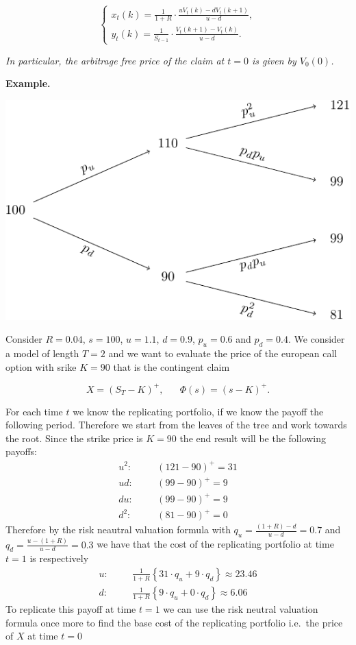 \documentclass[a4paper,10pt,openany]{book}
\begin{document}
\[
\left\{\begin{matrix}x_t(k)=\frac{1}{1+R}\cdot\frac{uV_t(k)-dV_t(k+1)}{u-d},\\ y_t(k)=\frac{1}{S_{t-1}}\cdot\frac{V_t(k+1)-V_t(k)}{u-d}.\end{matrix}\right.
\]

\emph{In particular, the arbitrage free price of the claim at \(t=0\) is given by \(V_0(0)\).}

\textbf{Example.}

\begin{center}\includegraphics[width=0.75\linewidth]{theory_files/figure-latex/unnamed-chunk-1-1} \end{center}

Consider \(R=0.04\), \(s=100\), \(u=1.1\), \(d=0.9\), \(p_u=0.6\) and \(p_d=0.4\). We consider a model of length \(T=2\) and we want to evaluate the price of the european call option with srike \(K=90\) that is the contingent claim

\[
X=(S_T-K)^+,\hspace{20pt}\Phi(s)=(s-K)^+.
\]

For each time \(t\) we know the replicating portfolio, if we know the payoff the following period. Therefore we start from the leaves of the tree and work towards the root. Since the strike price is \(K=90\) the end result will be the following payoffs:
\begin{align*}
u^2:\hspace{20pt}&(121-90)^+=31\\
ud:\hspace{20pt}&(99-90)^+=9\\
du:\hspace{20pt}&(99-90)^+=9\\
d^2:\hspace{20pt}&(81-90)^+=0
\end{align*}
Therefore by the risk neautral valuation formula with \(q_u=\frac{(1+R)-d}{u-d}=0.7\) and \(q_d=\frac{u-(1+R)}{u-d}=0.3\) we have that the cost of the replicating portfolio at time \(t=1\) is respectively
\begin{align*}
u:\hspace{20pt}&\frac{1}{1+R}\left\{31\cdot q_u + 9 \cdot q_d\right\}\approx 23.46\\
d:\hspace{20pt}&\frac{1}{1+R}\left\{9\cdot q_u + 0 \cdot q_d\right\}\approx 6.06
\end{align*}
To replicate this payoff at time \(t=1\) we can use the risk neutral valuation formula once more to find the base cost of the replicating portfolio i.e.~the price of \(X\) at time \(t=0\)
\end{document}
